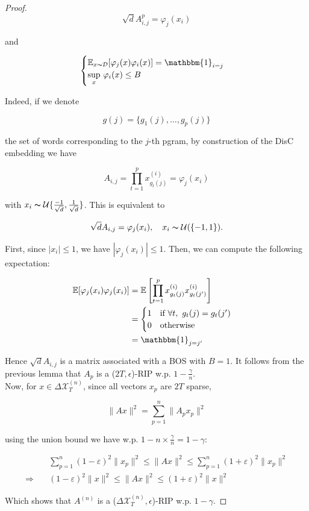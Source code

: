 \documentclass{article}
\newcommand{\un}{\mathbbm{1}}
\newcommand{\esp}{\mathbb E}
\begin{document}
\begin{proof}
$$ \sqrt{d} A^p_{i, j} = \varphi_j(x_i) $$

and 

$$ \begin{cases}
\esp_{x \thicksim \mathcal{D}}[\varphi_j(x)\varphi_i(x)] = \un_{i=j} \\
\underset{x}{\sup} \ \varphi_i(x) \leq B
\end{cases}
$$

Indeed, if we denote

$$ g(j) = \{g_1(j), ..., g_p(j)\} $$ 

the set of words corresponding to the $j$-th pgram, by construction of the DisC embedding we have

$$ A_{i, j} = \prod_{t=1}^p x^{(i)}_{g_t(j)} = \varphi_j(x_i) $$

with $x_i \thicksim \mathcal{U}\{\frac{-1}{\sqrt{d}}, \frac{1}{\sqrt{d}}\}$. This is equivalent to 

$$ \sqrt{d} A_{i, j} =  \varphi_j(x_i), \quad x_i \thicksim \mathcal{U}(\{-1, 1\}). $$

First, since $|x_i| \leq 1$, we have $|\varphi_j(x_i)| \leq 1$. Then, we can compute the following expectation:

\begin{align*}
\esp[\varphi_j(x_i)\varphi_j(x_i)] &= \esp\left[\prod_{t=1}^p x^{(i)}_{g_t(j)} x^{(i)}_{g_t(j')}\right] \\
&= \begin{cases}
1 \quad  \text{if} \ \forall t, \ g_t(j) = g_t(j') \\
0 \quad \text{otherwise}
\end{cases} \\
&= \un_{j=j'}
\end{align*}

Hence $ \sqrt{d} A_{i, j}$ is a matrix associated with a BOS with $B=1$. It follows from the previous lemma that $A_p$ is a ($2T, \epsilon$)-RIP w.p. $1 - \frac{\gamma}{n}$. \\

Now, for $x \in \Delta \mathcal{X}_T^{(n)}$, since all vectors $x_p$ are $2T$ sparse,

$$ \| A x \|^2  = \sum_{p=1}^n \| A_p x_p \|^2 $$

using the union bound we have w.p. $1 - n \times \frac{\gamma}{n} = 1 - \gamma$:

\begin{align*}
 &\sum_{p=1}^n (1-\varepsilon)^2 \| x_p \|^2 \leq \| A x \|^2  \leq \sum_{p=1}^n (1+\varepsilon)^2 \| x_p \|^2  \\
\Rightarrow \quad &(1-\varepsilon)^2 \| x \|^2 \leq\| A x \|^2 \leq (1+\varepsilon)^2 \| x \|^2
\end{align*}

Which shows that $A^{(n)}$ is a ($\Delta \mathcal{X}_T^{(n)}, \epsilon$)-RIP w.p. $1 - \gamma$. 

\end{proof}
\end{document}
